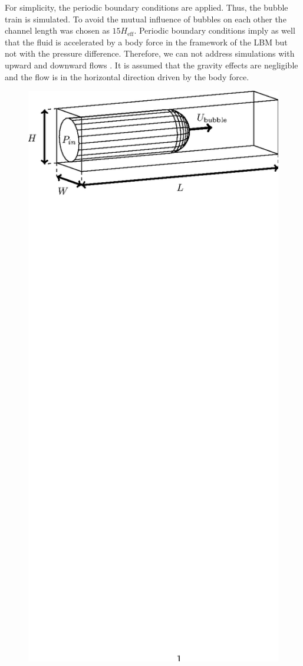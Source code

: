 \documentclass{article}
\begin{document}
For simplicity, the periodic boundary conditions are applied. Thus, the bubble train is simulated.
To avoid the mutual influence of bubbles on each other the channel length was chosen as $15
H_{\mathrm{eff}}$. Periodic boundary conditions imply as well that the fluid is accelerated by a
body force in the framework of the LBM but not with the pressure difference. Therefore, we can not
address simulations with upward and downward flows \cite{cerro-bubble-train}. It is assumed that
the gravity effects are negligible and the flow is in the horizontal direction driven by the body
force. 
\begin{figure}[!]
\includegraphics*[bb=153 610 405 717,width=\textwidth]{Figures/benchmark_classical.eps} 

\end{figure}
\end{document}
